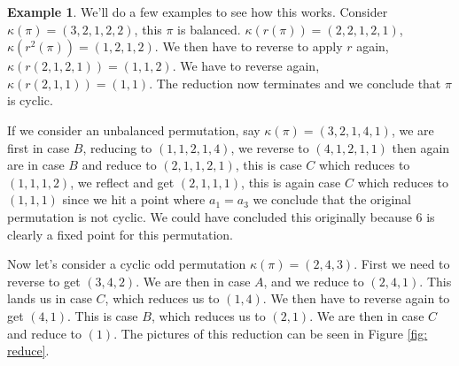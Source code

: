 \documentclass[11pt]{article}
\theoremstyle{definition}
\newtheorem{example}[theorem]{Example}
\begin{document}
\begin{example}
    We'll do a few examples to see how this works. Consider $\kappa(\pi) = (3,2,1,2,2)$, this $\pi$ is balanced. $\kappa(r(\pi)) = (2,2,1,2,1)$, $\kappa(r^2(\pi)) = (1,2,1,2)$. We then have to reverse to apply $r$ again, $\kappa(r(2,1,2,1)) = (1,1,2)$. We have to reverse again, $\kappa(r(2,1,1)) = (1,1)$. The reduction now terminates and we conclude that $\pi$ is cyclic.

    If we consider an unbalanced permutation, say $\kappa(\pi) = (3,2,1,4,1)$, we are first in case $B$, reducing to $(1,1,2,1,4)$, we reverse to $(4,1,2,1,1)$ then again are in case $B$ and reduce to $(2,1,1,2,1)$, this is case $C$ which reduces to $(1,1,1,2)$, we reflect and get $(2,1,1,1)$, this is again case $C$ which reduces to $(1,1,1)$ since we hit a point where $a_1 = a_3$ we conclude that the original permutation is not cyclic. We could have concluded this originally because $6$ is clearly a fixed point for this permutation.

    Now let's consider a cyclic odd permutation $\kappa(\pi) = (2,4,3)$. First we need to reverse to get $(3,4,2)$. We are then in case $A$, and we reduce to $(2,4,1)$. This lands us in case $C$, which reduces us to $(1,4)$. We then have to reverse again to get $(4,1)$. This is case $B$, which reduces us to $(2,1)$. We are then in case $C$ and reduce to $(1)$.  The pictures of this reduction can be seen in Figure \ref{fig: reduce}.
\end{example}
\vspace{-.5em}
\end{document}
